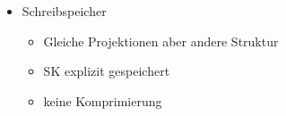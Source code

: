 \documentclass[11pt, paper=a4, twocolumn]{scrartcl}
\begin{document}
\begin{itemize}
\begin{itemize}
\begin{itemize}
								(val,bitmap) mit 
								Lauflängencodierung, 
								Offset-Indexe
							\item Sort., versch.:\\
								Delta-Codierung: Diff 
								zum Vorgänger in B-Baum
							\item Unsort., versch.:\\
								keine Kompr., B-Baum als 
								sekundär möglich
							\item Bei Zeichenketten Dictionary
						\end{itemize}
					\item Schreibspeicher
						\begin{itemize}
							\item Gleiche Projektionen aber 
								andere Struktur
							\item SK explizit gespeichert
							\item keine Komprimierung
						\end{itemize}
				\end{itemize}
		\end{itemize}
	
\end{document}
